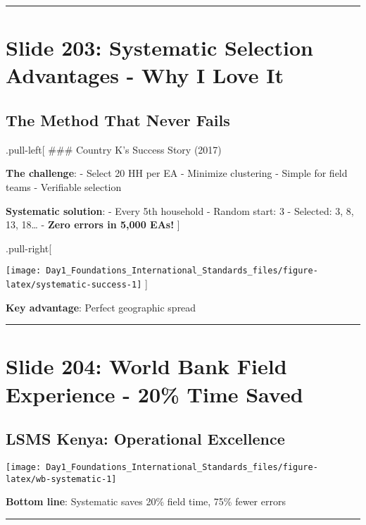 \documentclass[
]{article}
\begin{document}
\begin{center}\rule{0.5\linewidth}{0.5pt}\end{center}

\section{Slide 203: Systematic Selection Advantages - Why I Love
It}\label{slide-203-systematic-selection-advantages---why-i-love-it}

\subsection{The Method That Never
Fails}\label{the-method-that-never-fails}

.pull-left{[} \#\#\# Country K's Success Story (2017)

\textbf{The challenge}: - Select 20 HH per EA - Minimize clustering -
Simple for field teams - Verifiable selection

\textbf{Systematic solution}: - Every 5th household - Random start: 3 -
Selected: 3, 8, 13, 18\ldots{} - \textbf{Zero errors in 5,000 EAs!} {]}

.pull-right{[}

\texttt{[image: Day1\_Foundations\_International\_Standards\_files/figure-latex/systematic-success-1]}
{]}

\textbf{Key advantage}: Perfect geographic spread

\begin{center}\rule{0.5\linewidth}{0.5pt}\end{center}

\section{Slide 204: World Bank Field Experience - 20\% Time
Saved}\label{slide-204-world-bank-field-experience---20-time-saved}

\subsection{LSMS Kenya: Operational
Excellence}\label{lsms-kenya-operational-excellence}

\texttt{[image: Day1\_Foundations\_International\_Standards\_files/figure-latex/wb-systematic-1]}

\textbf{Bottom line}: Systematic saves 20\% field time, 75\% fewer
errors

\begin{center}\rule{0.5\linewidth}{0.5pt}\end{center}
\end{document}
